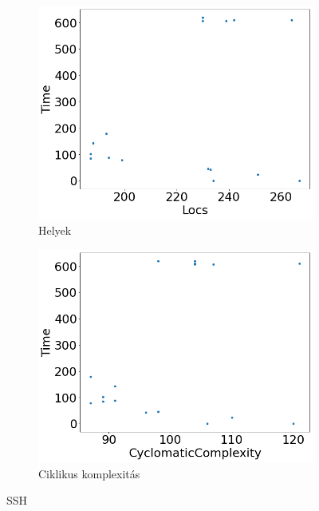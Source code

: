 \begin{figure}[ht]
\begin{subfigure}[b]{0.5\linewidth}
		\includegraphics[width=0.95\linewidth]{figures/ssh/locs.png} 
		\caption{Helyek} 
		\label{fig7:c} 
	\end{subfigure}%
	\begin{subfigure}[b]{0.5\linewidth}
		\centering
		\includegraphics[width=0.95\linewidth]{figures/ssh/cc.png} 
		\caption{Ciklikus komplexitás} 
		\label{fig7:d} 
	\end{subfigure} 
	\caption{SSH}
	\label{fig_ssh} 
\end{figure}

